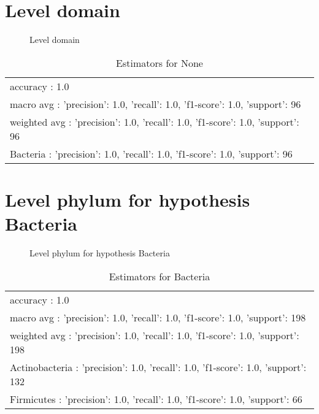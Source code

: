 \documentclass[12pt]{article}
\begin{document}
\section*{Level domain}
\begin{figure}[h]
\centering


\caption{Level domain}
\label{f-Level domain}
\end{figure}
\begin{table}[htp]
\begin{tabular}{l}
accuracy : 1.0 \\
macro avg : {'precision': 1.0, 'recall': 1.0, 'f1-score': 1.0, 'support': 96} \\
weighted avg : {'precision': 1.0, 'recall': 1.0, 'f1-score': 1.0, 'support': 96} \\
Bacteria : {'precision': 1.0, 'recall': 1.0, 'f1-score': 1.0, 'support': 96}
\end{tabular}
\caption*{Estimators for None}
\end{table}




\clearpage
\pagebreak[4]
\section*{Level phylum for hypothesis Bacteria}
\begin{figure}[h]
\centering


\caption{Level phylum for hypothesis Bacteria}
\label{f-Level phylum for hypothesis Bacteria}
\end{figure}
\begin{table}[htp]
\begin{tabular}{l}
accuracy : 1.0 \\
macro avg : {'precision': 1.0, 'recall': 1.0, 'f1-score': 1.0, 'support': 198} \\
weighted avg : {'precision': 1.0, 'recall': 1.0, 'f1-score': 1.0, 'support': 198} \\
Actinobacteria : {'precision': 1.0, 'recall': 1.0, 'f1-score': 1.0, 'support': 132} \\
Firmicutes : {'precision': 1.0, 'recall': 1.0, 'f1-score': 1.0, 'support': 66}
\end{tabular}
\caption*{Estimators for Bacteria}
\end{table}
\end{document}
